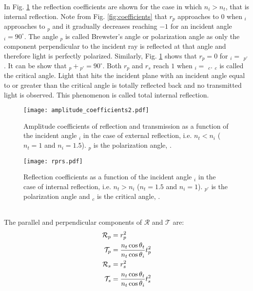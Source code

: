 In Fig. \ref{fig:coefficients2} the reflection coefficients are shown for the case in which $n_i>n_t$, that is internal reflection. Note from Fig. \ref{fig:coefficients} that $r_p$ approaches to $0$ when \myangle$_i$ approaches to \myangle$_p$ and it gradually decreases reaching $-1$ for an incident angle \myangle$_i=90^\circ$. The angle \myangle$_p$ is called Brewster's angle or polarization angle as only the component perpendicular to the incident ray is reflected at that angle and therefore light is perfectly polarized. Similarly, Fig. \ref{fig:coefficients2} shows that $r_p=0$ for \myangle$_i= $ \myangle$_{p\prime}$. It can be show that \myangle$_p+ $\myangle$_{p\prime}= 90^\circ$. Both $r_p$ and $r_s$ reach $1$ when \myangle$_i= $ \myangle$_c$. \myangle$_c$ is called the critical angle. Light that hits the incident plane with an incident angle equal to or greater than the critical angle is totally reflected back and no transmitted light is observed. This phenomenon is called total internal reflection. 
\begin{figure}[h]
  \begin{minipage}[h]{0.4\textwidth}
    \texttt{[image: amplitude\_coefficients2.pdf]}
    \caption{Amplitude coefficients of reflection and transmission as a function of the incident angle \myangle$_i$  in the case of external reflection, i.e. $n_t<n_i$
($n_t = 1$ and $n_i=1.5$). \myangle$_p$ is the polarization angle, \cite{hecht1998hecht}.}
    \label{fig:coefficients}
  \end{minipage} \hspace{2.5cm}
  \begin{minipage}[h]{0.4\textwidth}
    \texttt{[image: rprs.pdf]}
    \caption{Reflection coefficients as a function of the incident angle \myangle$_i$ in the case of internal reflection, i.e. $n_t>n_i$
($n_t = 1.5$ and $n_i=1$). \myangle$_{p\prime}$ is the polarization angle and \myangle$_c$ is the critical angle, \cite{hecht1998hecht}.}
   \label{fig:coefficients2}
 \end{minipage}
\end{figure}
\\ The parallel and perpendicular components of $\mathcal{R}$ and $\mathcal{T}$ are:
\begin{equation}\label{Fresnel_pands}
\begin{split}
\mathcal{R}_p& =  {r_p^2}\\
\mathcal{T}_p &=  \frac{n_t \cos\mbox{$\theta$}_t}{n_t \cos\mbox{$\theta$}_i}t_p^2\\
\mathcal{R}_s &=  r_s^2\\
\mathcal{T}_s &= \frac{n_t \cos\mbox{$\theta$}_t}{n_t \cos\mbox{$\theta$}_i}t_s^2\\
\end{split}
\end{equation}
